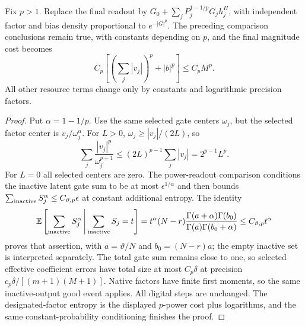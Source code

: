 \begin{corollary}
\label{cor:raw-bit-power}
Fix $p>1$. Replace the final readout by
$G_0+\sum_jP_j^{1-1/p}G_jh_j^H$, with independent factor and bias
density proportional to $e^{-|G|^p}$.
The preceding comparison conclusions remain true, with constants
depending on $p$, and the final magnitude cost becomes
\[
 C_p\left[\left(\sum_j|v_j|\right)^p+|b|^p\right]
 \le C_p M^p.
\]
All other resource terms change only by constants and logarithmic
precision factors.
\end{corollary}
\begin{proof}
Put $\alpha=1-1/p$. Use the same selected gate centers $\omega_j$,
but the selected factor center is $v_j/\omega_j^\alpha$.
For $L>0$, $\omega_j\ge|v_j|/(2L)$, so
\[
 \sum_j\frac{|v_j|^p}{\omega_j^{p-1}}
 \le(2L)^{p-1}\sum_j|v_j|
 =2^{p-1}L^p.
\]
For $L=0$ all selected centers are zero. The power-readout comparison
conditions the inactive latent gate sum to be at most
$\epsilon^{1/\alpha}$ and then bounds
$\sum_{\rm inactive}S_j^\alpha\le C_{\vartheta,p}\epsilon$
at constant additional entropy. The identity
\[
 \mathbb E\left[\sum_{\rm inactive}S_j^\alpha
          \,\middle|\,\sum_{\rm inactive}S_j=t\right]
 =
 t^\alpha(N-r)
 \frac{\Gamma(a+\alpha)\Gamma(b_0)}
      {\Gamma(a)\Gamma(b_0+\alpha)}
 \le C_{\vartheta,p}t^\alpha
\]
proves that assertion, with $a=\vartheta/N$ and
$b_0=(N-r)a$; the empty inactive set is interpreted separately.
The total gate sum remains close to one, so selected effective
coefficient errors have total size at most $C_p\delta$ at precision
$c_p\delta/[(m+1)(M+1)]$. Native factors have finite first moments,
so the same inactive-output good event applies. All digital steps
are unchanged. The designated-factor entropy is the displayed
$p$-power cost plus logarithms, and the same constant-probability
conditioning finishes the proof.
\end{proof}

